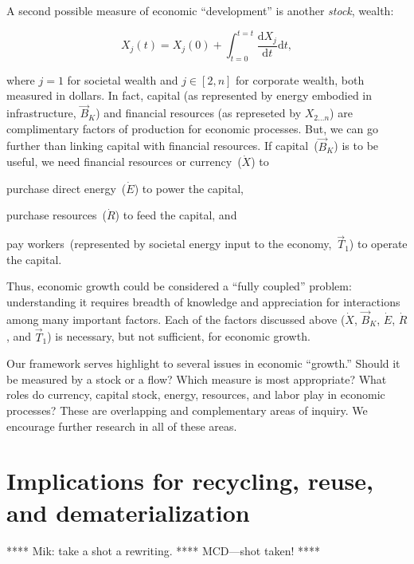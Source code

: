 A second possible measure of economic ``development'' is another \emph{stock}, 
wealth:

\begin{equation} \label{eq:Dev_Integral_Wealth}
	X_{j}(t) 
	= X_{j}(0) 
	+ \int_{t=0}^{t=t} \frac{\mathrm{d}X_{j}}{\mathrm{d}t}\mathrm{d}t,
\end{equation}

\noindent{}where $j=1$ for societal wealth 
and $j \in [2,n]$ for corporate wealth, both measured in dollars.
In fact, capital (as represented by energy embodied in infrastructure, $\vec{B}_{K}$) and 
financial resources (as represeted by $X_{2 \ldots n}$) 
are complimentary factors of production for economic processes. 
But, we can go further than linking capital with financial resources.
If capital~($\vec{B}_{K}$) is to be useful, we need financial resources
or currency~($\dot{X}$) to 
\begin{itemize}
	\item{purchase direct energy~($\dot{E}$) to power the capital,
	\item{purchase resources~($\dot{R}$) to feed the capital, and}
	\item{pay workers~(represented 
	by societal energy input to the economy,~$\vec{T}_{1}$) 
	to operate the capital.}
} 
\end{itemize}

Thus, economic growth could be considered a ``fully coupled'' problem:
understanding it requires breadth of knowledge and appreciation for 
interactions among many important factors.
Each of the factors discussed above 
($\dot{X}$, $\vec{B}_{K}$, $\dot{E}$, $\dot{R}$, and $\vec{T}_{1}$)
is necessary, but not sufficient, for economic growth.

Our framework serves highlight to several issues in economic ``growth.'' 
Should it be measured by a stock or a flow? 
Which measure is most appropriate? 
What roles do currency, capital stock, energy, resources, and labor
play in economic processes?
These are overlapping and complementary areas of inquiry.
We encourage further research in all of these areas.


\section{Implications for recycling, reuse, and dematerialization}
\label{sec:recycling}

**** Mik: take a shot a rewriting. **** MCD---shot taken! ****

